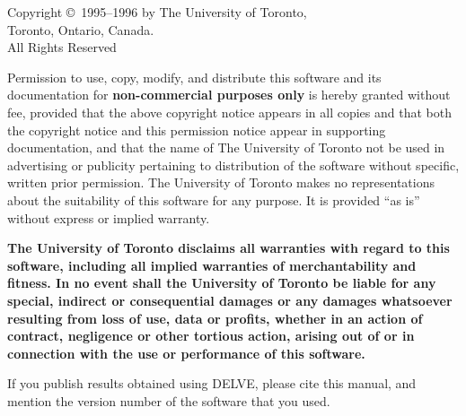 \documentclass[12pt]{article}
\newcommand{\delve}{DELVE}
\begin{document}
%
%

\thispagestyle{empty}

\clearpage


\thispagestyle{plain}

\vspace*{\fill}
\vspace*{-0.8in}
\begin{centering}
Copyright \copyright\ 1995--1996 by The University of Toronto,\\
Toronto, Ontario, Canada.\\[1ex]
All Rights Reserved\\[2ex]
\end{centering}

\noindent
Permission to use, copy, modify, and distribute this software and its
documentation for {\bf non-commercial purposes only} is hereby granted
without fee, provided that the above copyright notice appears in all
copies and that both the copyright notice and this permission notice
appear in supporting documentation, and that the name of The
University of Toronto not be used in advertising or publicity
pertaining to distribution of the software without specific, written
prior permission.  The University of Toronto makes no representations
about the suitability of this software for any purpose.  It is
provided ``as is'' without express or implied warranty.\vspace{7pt}

{\bf\noindent
The University of Toronto disclaims all warranties with regard to this
software, including all implied warranties of merchantability and
fitness.  In no event shall the University of Toronto be liable for
any special, indirect or consequential damages or any damages
whatsoever resulting from loss of use, data or profits, whether in an
action of contract, negligence or other tortious action, arising out
of or in connection with the use or performance of this software.  
}\vspace{0.4in}

\noindent If you publish results obtained using \delve{}, please cite
this manual, and mention the version number of the software that you
used.
\end{document}
